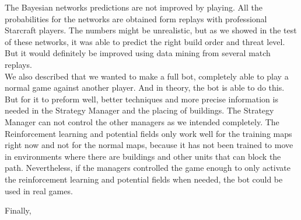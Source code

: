 The Bayesian networks predictions are not improved by playing. All the probabilities for the networks are obtained form replays with professional Starcraft players. The numbers might be unrealistic, but as we showed in the test of these networks, it was able to predict the right build order and threat level. But it would definitely be improved using data mining from several match replays. \\

We also described that we wanted to make a full bot, completely able to play a normal game against another player. And in theory, the bot is able to do this. But for it to preform well, better techniques and more precise information is needed in the Strategy Manager and the placing of buildings. The Strategy Manager can not control the other managers as we intended completely. The Reinforcement learning and potential fields only work well for the training maps right now and not for the normal maps, because it has not been trained to move in environments where there are buildings and other units that can block the path. Nevertheless, if the managers controlled the game enough to only activate the reinforcement learning and potential fields when needed, the bot could be used in real games.

Finally,  


